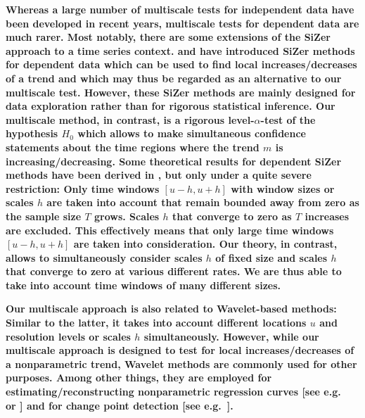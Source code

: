 \documentclass[a4paper,12pt]{article}
\begin{document}
{\bf Whereas a large number of multiscale tests for independent data have been developed in recent years, multiscale tests for dependent data are much rarer. Most notably, there are some extensions of the SiZer approach to a time series context. \cite{Rondonotti2004} and \cite{Rondonotti2007} have introduced SiZer methods for dependent data which can be used to find local increases/decreases of a trend and which may thus be regarded as an alternative to our multiscale test. However, these SiZer methods are mainly designed for data exploration rather than for rigorous statistical inference. Our multiscale method, in contrast, is a rigorous level-$\alpha$-test of the hypo\-thesis $H_0$ which allows to make simultaneous confidence statements about the time regions where the trend $m$ is increasing/decreasing. Some theoretical results for dependent SiZer methods have been derived in \cite{ParkHannigKang2009}, but only under a quite severe restriction: Only time windows $[u-h,u+h]$ with window sizes or scales $h$ are taken into account that remain bounded away from zero as the sample size $T$ grows. Scales $h$ that converge to zero as $T$ increases are excluded. This effectively means that only large time windows $[u-h,u+h]$ are taken into consideration. Our theory, in contrast, allows to simultaneously consider scales $h$ of fixed size and scales $h$ that converge to zero at various different rates. We are thus able to take into account time windows of many different sizes.}

{\bf Our multiscale approach is also related to Wavelet-based methods: Similar to the latter, it takes into account different locations $u$ and resolution levels or scales $h$ simultaneously. However, while our multiscale approach is designed to test for local increases/decreases of a nonparametric trend, Wavelet methods are commonly used for other purposes. Among other things, they are employed for estimating/reconstructing nonparametric regression curves [see e.g.\ \cite{Donoho1995} or \cite{vonSachsMacGibbon2000}] and for change point detection [see e.g.\ \citet{ChoFryzlewicz2012}].}


\end{document}
